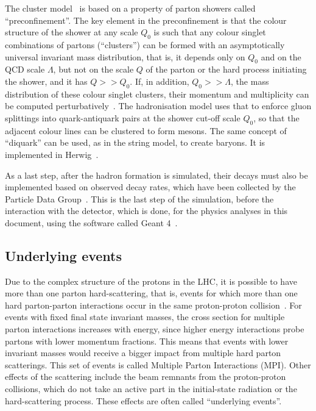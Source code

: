 The cluster model~\cite{cluster} is based on a property of parton showers called ``preconfinement''. The key element in the preconfinement is that the colour structure
of the shower at any scale $Q_0$ is such that any colour singlet combinations of partons (``clusters'') can be formed with an asymptotically universal invariant mass
distribution, that is, it depends only on $Q_0$ and on the QCD scale $\Lambda$,
but not on the scale $Q$ of the parton or the hard process initiating the shower, and it has $Q >> Q_0$.
If, in addition, $Q_0 >> \Lambda$, the mass distribution of these colour singlet clusters, their momentum and multiplicity can be computed perturbatively~\cite{lhc_event_gen}.
The hadronisation model uses that to enforce gluon splittings into quark-antiquark pairs at the shower cut-off scale $Q_0$, so that the adjacent colour lines can be
clustered to form mesons. The same concept of ``diquark'' can be used, as in the string model, to create baryons.
It is implemented in Herwig~\cite{herwig1,herwig2}.

As a last step, after the hadron formation is simulated, their decays must also be implemented based on observed decay rates, which have been collected by the
Particle Data Group~\cite{pdg2012}. This is the last step of the simulation, before the interaction with the detector, which is done, for the physics
analyses in this document, using the software called Geant 4~\cite{geant4}.

\subsection{Underlying events}

Due to the complex structure of the protons in the LHC, it is possible to have more than one parton hard-scattering, that is, events for which more than one hard parton-parton
interactions occur in the same proton-proton collision~\cite{mpi_review}. For events with fixed final state invariant masses, the cross section for multiple parton interactions
increases with energy, since higher energy interactions probe partons with lower momentum fractions. This means that events with lower invariant masses would receive
a bigger impact from multiple hard parton scatterings. This set of events is called Multiple Parton Interactions (MPI).
Other effects of the scattering include the
beam remnants from the proton-proton collisions, which do not take an
active part in the initial-state radiation or the hard-scattering process.
These effects are often called ``underlying events''.

